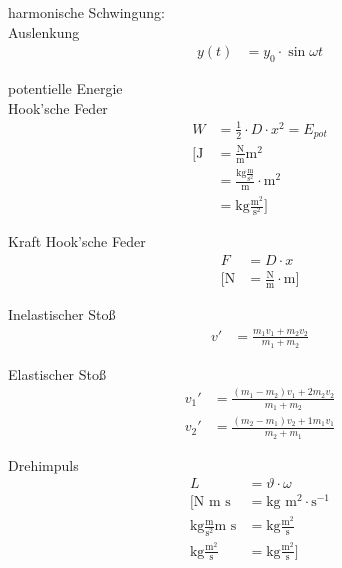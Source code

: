 \begin{karte}{harmonische Schwingung:\\Auslenkung}
    \begin{align*}
        y(t) &= y_0 \cdot \sin \omega t
    \end{align*}
\end{karte}

\begin{karte}{potentielle Energie\\Hook'sche Feder}
    \begin{align*}
        W &= \frac{1}{2}\cdot D\cdot x^2 = E_{pot} \\
        \bigg[ \text{J} &= \frac{\text{N}}{\text{m}} \text{m}^2 \\
        &= \frac{\text{kg}\frac{\text{m}}{\text{s}^2}}{\text{m}} \cdot \text{m}^2 \\
        &= \text{kg}\frac{\text{m}^2}{\text{s}^2} \bigg]
    \end{align*}
\end{karte}

\begin{karte}{Kraft Hook'sche Feder}
    \begin{align*}
        F &= D \cdot x \\
        \bigg[ \text{N} &= \frac{\text{N}}{\text{m}} \cdot \text{m} \bigg]
    \end{align*}
\end{karte}

\begin{karte}{Inelastischer Stoß}
    \begin{align*}
        v' &= \frac{ m_1v_1+m_2v_2}{m_1+m_2}
    \end{align*}
\end{karte}

\begin{karte}{Elastischer Stoß}
    \begin{align*}
        v_1'&= \frac{(m_1-m_2)v_1 + 2m_2v_2}{m_1+m_2} \\
        v_2'&= \frac{(m_2-m_1)v_2 + 1m_1v_1}{m_2+m_1}
    \end{align*}
\end{karte}


\begin{karte}{Drehimpuls}
    \begin{align*}
        L &= \vartheta \cdot \omega \\
        \bigg[ \text{N m s} &= \text{kg }\text{m}^2 \cdot \text{s}^{-1} \\
            \text{kg} \frac{\text{m}}{\text{s}^2} \text{m s}&= \text{kg} \frac{\text{m}^2}{\text{s}} \\
            \text{kg} \frac{\text{m}^2}{\text{s}} &= \text{kg} \frac{\text{m}^2}{\text{s}}
            \bigg]
    \end{align*}
\end{karte}

